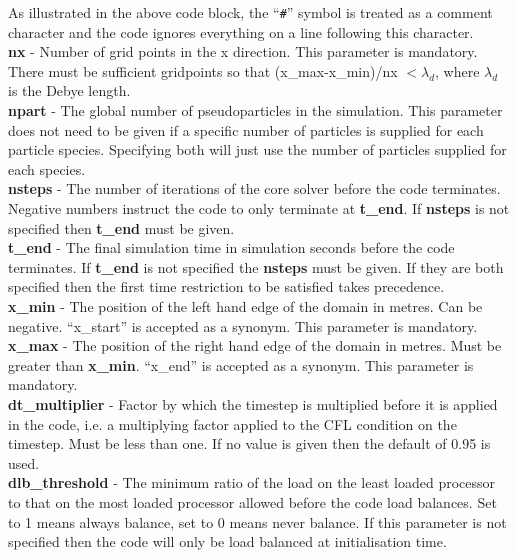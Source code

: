 \documentclass[12pt,a4paper]{article}
\newcommand{\emphtext}{\color{warwickdark} \fontfamily{phv}\selectfont\large\bf}
\newcommand{\inlineemph}[1]{{\color{warwicklight} \bf{#1}}}
\begin{document}
As illustrated in the above code block, the ``{\texttt{\#}}'' symbol is treated
as a comment character and the code ignores everything on a line following this
character.\\

{\emphtext nx} - Number of grid points in the x direction. This parameter
is mandatory. There must be sufficient gridpoints so that
(x\_max-x\_min)/nx $< \lambda_d$, where $\lambda_d$ is the Debye length.\\

{\emphtext npart} - The global number of pseudoparticles in the
simulation. This parameter does not need to be given if a specific number
of particles is supplied for each particle species. Specifying both will just
use the number of particles supplied for each species.\\

{\emphtext nsteps} - The number of iterations of the core solver before the
code terminates. Negative numbers instruct the code to only terminate at
\inlineemph{t\_end}. If \inlineemph{nsteps} is not specified then
\inlineemph{t\_end} must be given.\\

{\emphtext t\_end} - The final simulation time in simulation seconds before the
code terminates. If \inlineemph{t\_end} is not specified the
\inlineemph{nsteps} must be given. If they are both specified then
the first time restriction to be satisfied takes precedence.\\

{\emphtext x\_min} - The position of the left hand edge of the domain in
metres. Can be negative. ``x\_start'' is accepted as a synonym. This parameter
is mandatory.\\

{\emphtext x\_max} - The position of the right hand edge of the domain in
metres. Must be greater than \inlineemph{x\_min}.
``x\_end'' is accepted as a synonym. This parameter is mandatory.\\

{\emphtext dt\_multiplier} - Factor by which the timestep is multiplied before
it is applied in the code, i.e. a multiplying factor applied to the CFL
condition on the timestep. Must be less than one. If no value is given then
the default of 0.95 is used.\\

{\emphtext dlb\_threshold} - The minimum ratio of the
load on the least loaded processor to that on the most loaded processor allowed
before the code load balances. Set to 1 means
always balance, set to 0 means never balance. If this parameter is not
specified then the code will only be load balanced at initialisation time.\\
\end{document}
